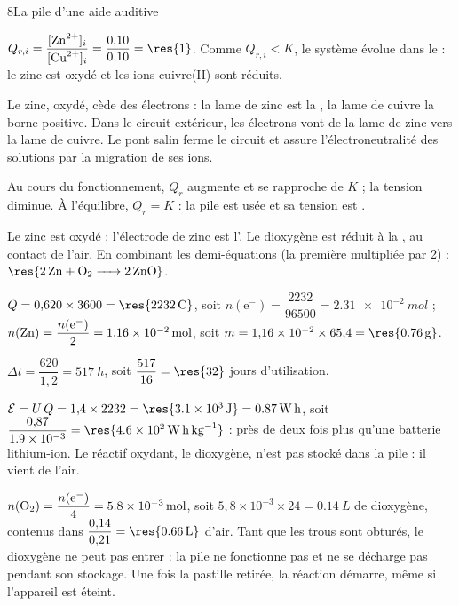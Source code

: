 

\begin{corrigeBac}{8}{La pile d'une aide auditive}
\begin{questions}
\item $Q_{r,i}=\dfrac{[\ce{Zn^{2+}}]_i}{[\ce{Cu^{2+}}]_i}=\dfrac{0{,}10}{0{,}10}=\res{1}$. Comme $Q_{r,i}<K$, le système évolue dans le  : le zinc
est oxydé et les ions cuivre(II) sont réduits. \pts{1 pt}
\item Le zinc, oxydé, cède des électrons : la lame de zinc est la , la lame de cuivre la borne
positive. Dans le circuit extérieur, les électrons vont de la lame de zinc vers la lame de cuivre. Le pont salin ferme le
circuit et assure l'électroneutralité des solutions par la migration de ses ions. \pts{1 pt}
\item Au cours du fonctionnement, $Q_r$ augmente et se rapproche de $K$ ; la tension diminue. À l'équilibre, $Q_r=K$ : la pile
est usée et sa tension est . 
\end{questions}
\begin{questions}[resume]
\item Le zinc est oxydé : l'électrode de zinc est l'. Le dioxygène est réduit à la , au contact de
l'air. En combinant les demi-équations (la première multipliée par 2) : $\res{\ce{2Zn + O2 -> 2ZnO}}$. \pts{1 pt}
\item $Q=0{,}620\times3600=\res{\qty{2232}{C}}$, soit $n(\mathrm{e}^-)=\dfrac{2232}{96500}=\qty{2,31e-2}{mol}$ ; $n(\ce{Zn})=\dfrac{n(\mathrm{e}^-)}{2}=\qty{1,16e-2}{mol}$, soit
$m=1{,}16\times10^{-2}\times65{,}4=\res{\qty{0,76}{g}}$. 
\item $\Delta t=\dfrac{620}{1{,}2}=\qty{517}{h}$, soit $\dfrac{517}{16}=\res{32}$ jours d'utilisation. 
\item $\mathcal{E}=U\,Q=1{,}4\times2232=\res{\qty{3,1e3}{J}}=\qty{0,87}{W.h}$, soit $\dfrac{0{,}87}{\num{1.9e-3}}=\res{\qty{4,6e2}{W.h.kg^{-1}}}$ : près de deux fois plus
qu'une batterie lithium-ion. Le réactif oxydant, le dioxygène, n'est pas stocké dans la pile : il vient de l'air. \pts{1 pt}
\item $n(\ce{O2})=\dfrac{n(\mathrm{e}^-)}{4}=\qty{5,8e-3}{mol}$, soit $5{,}8\times10^{-3}\times24=\qty{0,14}{L}$ de dioxygène, contenus dans $\dfrac{0{,}14}{0{,}21}=\res{\qty{0,66}{L}}$
d'air. Tant que les trous sont obturés, le dioxygène ne peut pas entrer : la pile ne fonctionne pas et ne se décharge
pas pendant son stockage. Une fois la pastille retirée, la réaction démarre, même si l'appareil est éteint. 
\end{questions}
\end{corrigeBac}

